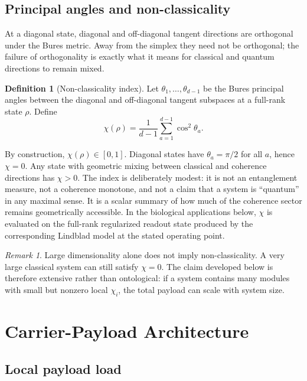 \documentclass[11pt,a4paper]{article}
\theoremstyle{definition}
\newtheorem{definition}[theorem]{Definition}
\theoremstyle{remark}
\newtheorem{remark}[theorem]{Remark}
\begin{document}
\subsection{Principal angles and non-classicality}

At a diagonal state, diagonal and off-diagonal tangent directions are orthogonal under the Bures metric. Away from the simplex they need not be orthogonal; the failure of orthogonality is exactly what it means for classical and quantum directions to remain mixed.

\begin{definition}[Non-classicality index]
\label{def:chi}
Let $\theta_1,\ldots,\theta_{d-1}$ be the Bures principal angles between the diagonal and off-diagonal tangent subspaces at a full-rank state $\rho$. Define
\begin{equation}
\label{eq:chi}
\chi(\rho)=\frac{1}{d-1}\sum_{a=1}^{d-1}\cos^2\theta_a.
\end{equation}
\end{definition}

By construction, $\chi(\rho)\in[0,1]$. Diagonal states have $\theta_a=\pi/2$ for all $a$, hence $\chi=0$. Any state with geometric mixing between classical and coherence directions has $\chi>0$. The index is deliberately modest: it is not an entanglement measure, not a coherence monotone, and not a claim that a system is ``quantum'' in any maximal sense. It is a scalar summary of how much of the coherence sector remains geometrically accessible. In the biological applications below, $\chi$ is evaluated on the full-rank regularized readout state produced by the corresponding Lindblad model at the stated operating point.

\begin{remark}
\label{rem:highd}
Large dimensionality alone does not imply non-classicality. A very large classical system can still satisfy $\chi=0$. The claim developed below is therefore extensive rather than ontological: if a system contains many modules with small but nonzero local $\chi_i$, the total payload can scale with system size.
\end{remark}

\section{Carrier-Payload Architecture}
\label{sec:architecture}

\subsection{Local payload load}
\end{document}

